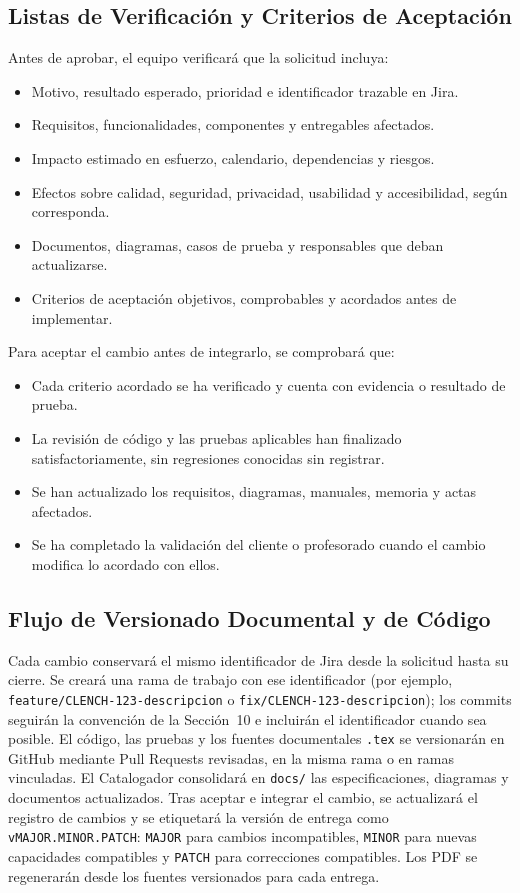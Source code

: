 \subsection{Listas de Verificación y Criterios de Aceptación}
Antes de aprobar, el equipo verificará que la solicitud incluya:
\begin{itemize}[leftmargin=*,label=$\square$]
  \item Motivo, resultado esperado, prioridad e identificador trazable en Jira.
  \item Requisitos, funcionalidades, componentes y entregables afectados.
  \item Impacto estimado en esfuerzo, calendario, dependencias y riesgos.
  \item Efectos sobre calidad, seguridad, privacidad, usabilidad y accesibilidad, según corresponda.
  \item Documentos, diagramas, casos de prueba y responsables que deban actualizarse.
  \item Criterios de aceptación objetivos, comprobables y acordados antes de implementar.
\end{itemize}

Para aceptar el cambio antes de integrarlo, se comprobará que:
\begin{itemize}[leftmargin=*,label=$\square$]
  \item Cada criterio acordado se ha verificado y cuenta con evidencia o resultado de prueba.
  \item La revisión de código y las pruebas aplicables han finalizado satisfactoriamente, sin regresiones conocidas sin registrar.
  \item Se han actualizado los requisitos, diagramas, manuales, memoria y actas afectados.
  \item Se ha completado la validación del cliente o profesorado cuando el cambio modifica lo acordado con ellos.
\end{itemize}

\subsection{Flujo de Versionado Documental y de Código}
Cada cambio conservará el mismo identificador de Jira desde la solicitud hasta su cierre. Se creará una rama de trabajo con ese identificador (por ejemplo, \texttt{feature/CLENCH-123-descripcion} o \texttt{fix/CLENCH-123-descripcion}); los commits seguirán la convención de la Sección~10 e incluirán el identificador cuando sea posible. El código, las pruebas y los fuentes documentales \texttt{.tex} se versionarán en GitHub mediante Pull Requests revisadas, en la misma rama o en ramas vinculadas. El Catalogador consolidará en \texttt{docs/} las especificaciones, diagramas y documentos actualizados. Tras aceptar e integrar el cambio, se actualizará el registro de cambios y se etiquetará la versión de entrega como \texttt{vMAJOR.MINOR.PATCH}: \texttt{MAJOR} para cambios incompatibles, \texttt{MINOR} para nuevas capacidades compatibles y \texttt{PATCH} para correcciones compatibles. Los PDF se regenerarán desde los fuentes versionados para cada entrega.

